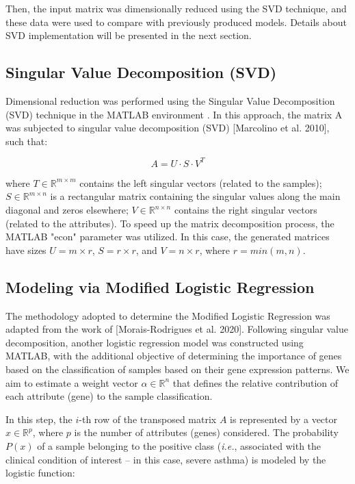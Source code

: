Then, the input matrix was dimensionally reduced using the SVD technique, and these data were used to compare with previously produced models. Details about SVD implementation will be presented in the next section.

\subsection{Singular Value Decomposition (SVD)}

Dimensional reduction was performed using the Singular Value Decomposition (SVD) technique in the MATLAB environment . In this approach, the matrix A was subjected to singular value decomposition (SVD) [Marcolino et al. 2010], such that:

\begin{equation}
  A = U \cdot S \cdot V^T
\end{equation}

where $T \in \mathbb{R}^{m \times m}$ contains the left singular vectors (related to the samples); $S \in \mathbb{R}^{m \times n}$ is a rectangular matrix containing the singular values along the main diagonal and zeros elsewhere; $V \in \mathbb{R}^{n \times n}$ contains the right singular vectors (related to the attributes). To speed up the matrix decomposition process, the MATLAB "econ" parameter was utilized. In this case, the generated matrices have sizes $U = m \times r$, $S = r \times r$, and $V = n \times r$, where $r = min(m, n)$.

\subsection{Modeling via Modified Logistic Regression}

The methodology adopted to determine the Modified Logistic Regression was adapted from the work of [Morais-Rodrigues et al. 2020]. Following singular value decomposition, another logistic regression model was constructed using MATLAB, with the additional objective of determining the importance of genes based on the classification of samples based on their gene expression patterns. We aim to estimate a weight vector $\alpha \in \mathbb{R}^n$ that defines the relative contribution of each attribute (gene) to the sample classification.

In this step, the $i$-th row of the transposed matrix $A$ is represented by a vector $x \in \mathbb{R}^p$, where $p$ is the number of attributes (genes) considered. The probability $P(x)$ of a sample belonging to the positive class (\textit{i.e.}, associated with the clinical condition of interest – in this case, severe asthma) is modeled by the logistic function:

